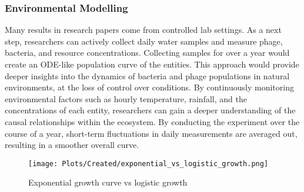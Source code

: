 \subsubsection{Environmental Modelling}
Many results in research papers come from controlled lab settings. 
As a next step, researchers can actively collect daily water samples and measure phage, bacteria, and resource concentrations. 
Collecting samples for over a year would create an ODE-like population curve of the entities. 
This approach would provide deeper insights into the dynamics of bacteria and phage populations in natural environments, at the loss of control over conditions. 
By continuously monitoring environmental factors such as hourly temperature, rainfall, and the concentrations of each entity, researchers can gain a deeper understanding of the causal relationships within the ecosystem.
By conducting the experiment over the course of a year, short-term fluctuations in daily measurements are averaged out, resulting in a smoother overall curve.


\begin{figure}
    \centering
    \texttt{[image: Plots/Created/exponential\_vs\_logistic\_growth.png]}
    \caption{Exponential growth curve vs logistic growth}
    \label{fig:created:exponential_vs_logistic_growth}
\end{figure}